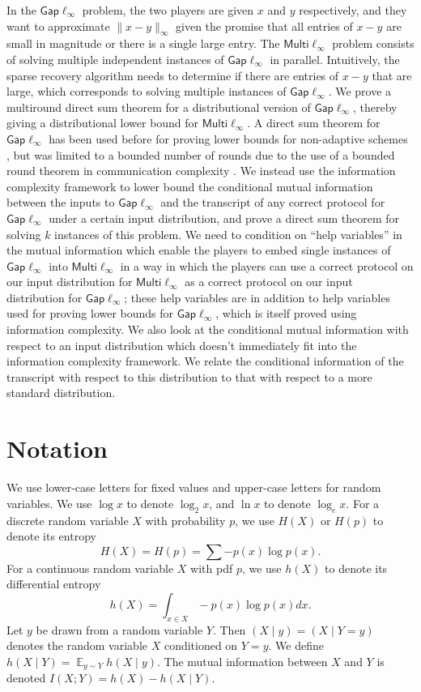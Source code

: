 \documentclass[twoside,leqno,twocolumn]{article}
\newcommand{\gaplinf}{\mathsf{Gap}\ell_{\infty}}
\newcommand{\multiLinf}{\mathsf{Multi}\ell_{\infty}}
\DeclareMathOperator*{\E}{\mathbb{E}}
\begin{document}
In the $\gaplinf$ problem, the two players are given $x$ and $y$ respectively,
and they want to approximate $\|x-y\|_{\infty}$ given the promise that all entries
of $x-y$ are small in magnitude or there is a single large entry. The $\multiLinf$
problem consists of solving multiple independent instances of $\gaplinf$ in parallel. Intuitively,
the sparse recovery algorithm needs to determine if there are entries of $x-y$ that are large, which
corresponds to solving multiple instances of $\gaplinf$. 
We prove a multiround direct sum theorem for a distributional version of $\gaplinf$, 
thereby giving a distributional lower bound for $\multiLinf$. A direct sum theorem for $\gaplinf$
has been used before for proving lower bounds
for non-adaptive schemes \cite{PW11}, but was limited to a bounded
number of rounds due to the use of a bounded round theorem in
communication complexity \cite{br11}.
We instead use the information complexity framework \cite{BJKS04} to 
lower bound the conditional mutual information between the inputs to $\gaplinf$
and the transcript of any correct protocol for $\gaplinf$ under a certain input distribution, and prove a 
direct sum theorem for solving $k$ instances of this problem. 
We need to condition on ``help variables'' in the mutual information which enable the players
to embed single instances of $\gaplinf$ into $\multiLinf$ in a way in which the players can use
a correct protocol on our input distribution for $\multiLinf$ 
as a correct protocol on
our input distribution for $\gaplinf$; these help variables are 
in addition to help variables used for proving
lower bounds for $\gaplinf$, which
is itself proved using information complexity. We also look 
at the conditional mutual information with respect to an input distribution 
which doesn't immediately fit into the information complexity framework. 
We relate the conditional information of the transcript with respect to this
distribution to that with respect to a more standard distribution. 
\section{Notation}

We use lower-case letters for fixed values and upper-case letters for
random variables.  We use $\log x$ to denote $\log_2 x$, and $\ln x$
to denote $\log_e x$.  For a discrete random variable $X$ with
probability $p$, we use $H(X)$ or $H(p)$ to denote its entropy
\[
H(X) = H(p) = \sum - p(x) \log p(x).
\]
For a continuous random variable $X$ with pdf $p$, we use $h(X)$ to
denote its differential entropy
\[
h(X) = \int_{x \in X} -p(x) \log p(x) dx.
\]
Let $y$ be drawn from a random variable $Y$.  Then $(X \mid y) = (X
\mid Y = y)$ denotes the random variable $X$ conditioned on $Y = y$.
We define $h(X \mid Y) = \E_{y\sim Y} h(X \mid y)$.  The mutual
information between $X$ and $Y$ is denoted $I(X; Y) = h(X) - h(X \mid
Y)$.
\end{document}
